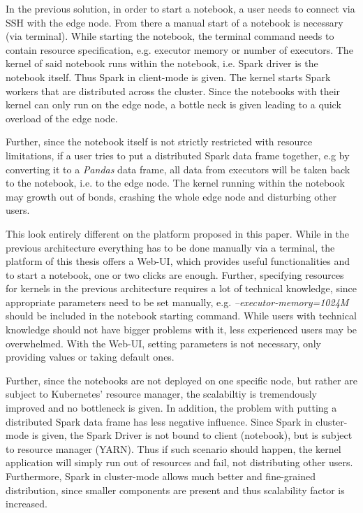 \documentclass[a4paper,twoside]{article}
\begin{document}
In the previous solution, in order to start a notebook, a user needs to connect via SSH with the edge node. From there a manual start of a notebook is necessary (via terminal). While starting the notebook, the terminal command needs to contain resource specification, e.g. executor memory or number of executors. The kernel of said notebook runs within the notebook, i.e. Spark driver is the notebook itself. Thus Spark in client-mode is given. The kernel starts Spark workers that are distributed across the cluster. Since the notebooks with their kernel can only run on the edge node, a bottle neck is given leading to a quick overload of the edge node.

Further, since the notebook itself is not strictly restricted with resource limitations, if a user tries to put a distributed Spark data frame together, e.g by converting it to a \textit{Pandas} data frame, all data from executors will be taken back to the notebook, i.e. to the edge node. The kernel running within the notebook may growth out of bonds, crashing the whole edge node and disturbing other users.

This look entirely different on the platform proposed in this paper. While in the previous architecture everything has to be done manually via a terminal, the platform of this thesis offers a Web-UI, which provides useful functionalities and to start a notebook, one or two clicks are enough. Further, specifying resources for kernels in the previous architecture requires a lot of technical knowledge, since appropriate parameters need to be set manually, e.g.  \textit{--executor-memory=1024M} should be included in the notebook starting command. While users with technical knowledge should not have bigger problems with it, less experienced users may be overwhelmed. With the Web-UI, setting parameters is not necessary, only providing values or taking default ones.

Further, since the notebooks are not deployed on one specific node, but rather are subject to Kubernetes' resource manager, the scalabiltiy is tremendously improved and no bottleneck is given. In addition, the problem with putting a distributed Spark data frame has less negative influence. Since Spark in cluster-mode is given, the Spark Driver is not bound to client (notebook), but is subject to resource manager (YARN). Thus if such scenario should happen, the kernel application will simply run out of resources and fail, not distributing other users. Furthermore, Spark in cluster-mode allows much better and fine-grained distribution, since smaller components are present and thus scalability factor is increased.
\end{document}
